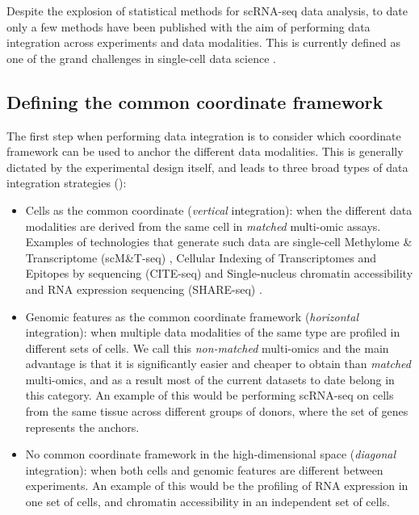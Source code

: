 Despite the explosion of statistical methods for scRNA-seq data analysis, to date only a few methods have been published with the aim of performing data integration across experiments and data modalities. This is currently defined as one of the grand challenges in single-cell data science \cite{Lahnemann2020}.

\subsection{Defining the common coordinate framework}

The first step when performing data integration is to consider which coordinate framework can be used to anchor the different data modalities. This is generally dictated by the experimental design itself, and leads to three broad types of data integration strategies (): 

\begin{itemize}

	\item Cells as the common coordinate (\textit{vertical} integration): when the different data modalities are derived from the same cell in \textit{matched} multi-omic assays. Examples of technologies that generate such data are single-cell Methylome \& Transcriptome (scM\&T-seq) \cite{Angermueller2016}, Cellular Indexing of Transcriptomes and Epitopes by sequencing (CITE-seq) \cite{Stoeckius2017} and Single-nucleus chromatin accessibility and RNA expression sequencing (SHARE-seq) \cite{Ma2020}.

	\item Genomic features as the common coordinate framework (\textit{horizontal} integration): when multiple data modalities of the same type are profiled in different sets of cells. We call this \textit{non-matched} multi-omics and the main advantage is that it is significantly easier and cheaper to obtain than \textit{matched} multi-omics, and as a result most of the current datasets to date belong in this category. An example of this would be performing scRNA-seq on cells from the same tissue across different groups of donors, where the set of genes represents the anchors.

	\item No common coordinate framework in the high-dimensional space (\textit{diagonal} integration): when both cells and genomic features are different between experiments. An example of this would be the profiling of RNA expression in one set of cells, and chromatin accessibility in an independent set of cells.

\end{itemize}

